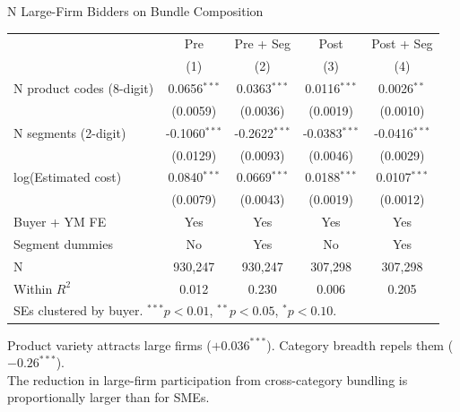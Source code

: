 \documentclass[9pt,aspectratio=169]{beamer}
\begin{document}
\begin{frame}{N Large-Firm Bidders on Bundle Composition}
\centering\small
\begin{tabular}{lcccc}
\toprule
 & Pre & Pre + Seg & Post & Post + Seg \\
 & (1) & (2) & (3) & (4) \\
\midrule
N product codes (8-digit) & 0.0656$^{***}$ & 0.0363$^{***}$ & 0.0116$^{***}$ & 0.0026$^{**}$ \\
 & (0.0059) & (0.0036) & (0.0019) & (0.0010) \\[2pt]
N segments (2-digit) & -0.1060$^{***}$ & -0.2622$^{***}$ & -0.0383$^{***}$ & -0.0416$^{***}$ \\
 & (0.0129) & (0.0093) & (0.0046) & (0.0029) \\[2pt]
log(Estimated cost) & 0.0840$^{***}$ & 0.0669$^{***}$ & 0.0188$^{***}$ & 0.0107$^{***}$ \\
 & (0.0079) & (0.0043) & (0.0019) & (0.0012) \\[2pt]
\midrule
Buyer + YM FE & Yes & Yes & Yes & Yes \\
Segment dummies & No & Yes & No & Yes \\
N & 930,247 & 930,247 & 307,298 & 307,298 \\
Within $R^2$ & 0.012 & 0.230 & 0.006 & 0.205 \\
\bottomrule
\multicolumn{5}{l}{\footnotesize SEs clustered by buyer. $^{***}p<0.01$, $^{**}p<0.05$, $^{*}p<0.10$.} \\
\end{tabular}

\medskip
\small Product variety attracts large firms ($+0.036^{***}$). Category breadth repels them ($-0.26^{***}$). \\
The reduction in large-firm participation from cross-category bundling is proportionally larger than for SMEs.
\end{frame}
\end{document}
